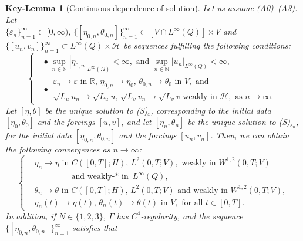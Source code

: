\documentclass{sinst}
\numberwithin{equation}{section}
\theoremstyle{plain}
\newtheorem{keylem}{Key-Lemma}
\theoremstyle{definition}
\def\N{\mathbb{N}}
\def\R{\mathbb{R}}
\def\sH{\mathscr{H}}
\begin{document}
\begin{keylem}[Continuous dependence of solution] \label{lem:CD}
  Let us assume (A0)--(A3). Let 
  \\
  $\{ \varepsilon_n \}_{n=1}^\infty \subset [0,\infty)$, $\{ [\eta_{0,n}, \theta_{0,n}] \}_{n=1}^\infty \subset [V \cap L^\infty(Q)] \times V$ and $\{ [u_n, v_n] \}_{n=1}^\infty \subset L^\infty(Q) \times \sH$ be sequences fulfilling the following conditions:
  \begin{equation}
    \left\{ \begin{aligned}
      &\bullet \ \sup_{n \in \N} |\eta_{0,n}|_{L^\infty(\Omega)} < \infty, \mbox{ and } \sup_{n \in \N} |u_n|_{L^\infty(Q)} < \infty,
      \\
      &\bullet \ \begin{gathered}
        \varepsilon_n \to \varepsilon \mbox{ in } \R, \, \eta_{0,n} \to \eta_0, \, \theta_{0,n} \to \theta_0 \mbox{ in } V, \mbox{ and }
        \\
        \sqrt{L_u} u_n \to \sqrt{L_u} u, \, \sqrt{L_v} v_n \to \sqrt{L_v} v \mbox{ weakly in } \sH, \mbox{ as } n \to \infty.
      \end{gathered}
    \end{aligned} \right.
  \end{equation}
  Let $[\eta, \theta]$ be the unique solution to (S)$_\varepsilon$, corresponding to the initial data $[\eta_0, \theta_0]$ and the forcings $[u,v]$, and let $[\eta_n, \theta_n]$ be the unique solution to (S)$_{\varepsilon_n}$, for the initial data $[\eta_{0,n}, \theta_{0,n}]$ and the forcings $[u_n,v_n]$. Then, we can obtain the following convergences as $n \to \infty$:
  \begin{equation}
    \left\{ \begin{aligned}
      &\eta_n \to \eta \mbox{ in } C([0,T];H), \, L^2(0,T;V), \mbox{ weakly in } W^{1,2}(0,T;V)
      \\
      &\qquad\qquad\mbox{ and weakly-$*$ in } L^\infty(Q),
      \\
      &\theta_n \to \theta \mbox{ in } C([0,T];H), \, L^2(0,T;V) \mbox{ and weakly in } W^{1,2}(0,T;V),
      \\
      &\eta_n(t) \to \eta(t), \, \theta_n(t) \to \theta(t) \mbox{ in } V, \mbox{ for all } t \in [0,T].
    \end{aligned}\right.
  \end{equation}
  In addition, if $N \in \{ 1,2,3 \}$, $\Gamma$ has $C^4$-regularity, and the sequence $\{ [\eta_{0,n}, \theta_{0,n}] \}_{n=1}^\infty$ satisfies that

\end{keylem}
\end{document}

